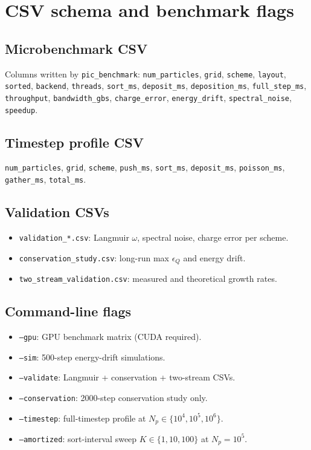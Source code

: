 \section{CSV schema and benchmark flags}
\label{app:csv}

\subsection{Microbenchmark CSV}
Columns written by \texttt{pic\_benchmark}:
\texttt{num\_particles}, \texttt{grid}, \texttt{scheme}, \texttt{layout}, \texttt{sorted}, \texttt{backend}, \texttt{threads}, \texttt{sort\_ms}, \texttt{deposit\_ms}, \texttt{deposition\_ms}, \texttt{full\_step\_ms}, \texttt{throughput}, \texttt{bandwidth\_gbs}, \texttt{charge\_error}, \texttt{energy\_drift}, \texttt{spectral\_noise}, \texttt{speedup}.

\subsection{Timestep profile CSV}
\texttt{num\_particles}, \texttt{grid}, \texttt{scheme}, \texttt{push\_ms}, \texttt{sort\_ms}, \texttt{deposit\_ms}, \texttt{poisson\_ms}, \texttt{gather\_ms}, \texttt{total\_ms}.

\subsection{Validation CSVs}
\begin{itemize}
    \item \texttt{validation\_*.csv}: Langmuir $\omega$, spectral noise, charge error per scheme.
    \item \texttt{conservation\_study.csv}: long-run max $\epsilon_Q$ and energy drift.
    \item \texttt{two\_stream\_validation.csv}: measured and theoretical growth rates.
\end{itemize}

\subsection{Command-line flags}
\begin{itemize}
    \item \texttt{--gpu}: GPU benchmark matrix (CUDA required).
    \item \texttt{--sim}: 500-step energy-drift simulations.
    \item \texttt{--validate}: Langmuir + conservation + two-stream CSVs.
    \item \texttt{--conservation}: 2000-step conservation study only.
    \item \texttt{--timestep}: full-timestep profile at $N_p \in \{10^4,10^5,10^6\}$.
    \item \texttt{--amortized}: sort-interval sweep $K \in \{1,10,100\}$ at $N_p=10^5$.
\end{itemize}
